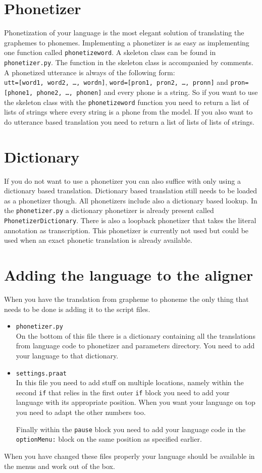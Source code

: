 \section{Phonetizer}
Phonetization of your language is the most elegant solution of translating the
graphemes to phonemes. Implementing a phonetizer is as easy as implementing one
function called \texttt{phonetizeword}. A skeleton class can be found in
\texttt{phonetizer.py}. The function in the skeleton class is accompanied by
comments. A phonetized utterance is always of the following form:\\
\texttt{utt=[word1, word2, \ldots, wordn]}, 
\texttt{word=[pron1, pron2, \ldots, pronn]} and
\texttt{pron=[phone1, phone2, \ldots, phonen]} and every phone is a string.
So if you want to use the skeleton class with the \texttt{phonetizeword}
function you need to return a list of lists of strings where every
string is a phone from the model. If you also want to do utterance based
translation you need to return a list of lists of lists of strings.

\section{Dictionary}
If you do not want to use a phonetizer you can also suffice with only using a
dictionary based translation. Dictionary based translation still needs to be
loaded as a phonetizer though. All phonetizers include also a dictionary based
lookup. In the \texttt{phonetizer.py} a dictionary phonetizer is already
present called \texttt{PhonetizerDictionary}. There is also a loopback
phonetizer that takes the literal annotation as transcription. This phonetizer
is currently not used but could be used when an exact phonetic translation is
already available.

\section{Adding the language to the aligner}
When you have the translation from grapheme to phoneme the only thing that
needs to be done is adding it to the script files.
\begin{itemize}
	\item \texttt{phonetizer.py}\\
		On the bottom of this file there is a dictionary containing all the
		translations from language code to phonetizer and parameters directory. You
		need to add your language to that dictionary.
	\item \texttt{settings.praat}\\
		In this file you need to add stuff on multiple locations, namely within the
		second \texttt{if} that relies in the first outer \texttt{if} block you
		need to add your language with its appropriate position. When you want your
		language on top you need to adapt the other numbers too.

		Finally within the \texttt{pause} block you need to add your language code
		in the \texttt{optionMenu:} block on the same position as specified
		earlier.
\end{itemize}
When you have changed these files properly your language should be available in
the menus and work out of the box.


